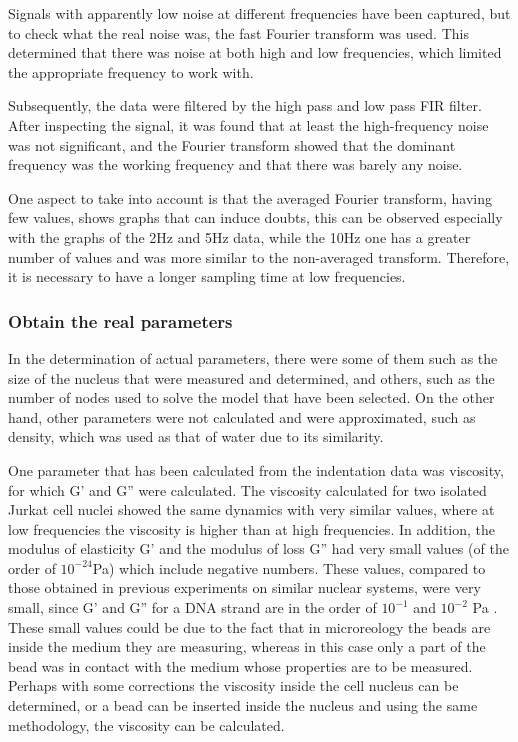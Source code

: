 \documentclass[12pt, a4paper]{article} %
\begin{document}
Signals with apparently low noise at different frequencies have been captured, but to check what the real noise was, the fast Fourier transform was used. This determined that there was noise at both high and low frequencies, which limited the appropriate frequency to work with.

\setlength{\parskip}{4mm}

Subsequently, the data were filtered by the high pass and low pass FIR filter. After inspecting the signal, it was found that at least the high-frequency noise was not significant, and the Fourier transform showed that the dominant frequency was the working frequency and that there was barely any noise.

One aspect to take into account is that the averaged Fourier transform, having few values, shows graphs that can induce doubts, this can be observed especially with the graphs of the 2Hz and 5Hz data, while the 10Hz one has a greater number of values and was more similar to the non-averaged transform. Therefore, it is necessary to have a longer sampling time at low frequencies.

\setlength{\parskip}{0mm}

\subsubsection{Obtain the real parameters}

In the determination of actual parameters, there were some of them such as the size of the nucleus that were measured and determined, and others, such as the number of nodes used to solve the model that have been selected. On the other hand, other parameters were not calculated and were approximated, such as density, which was used as that of water due to its similarity.

\setlength{\parskip}{4mm}

One parameter that has been calculated from the indentation data was viscosity, for which G' and G'' were calculated. The viscosity calculated for two isolated Jurkat cell nuclei showed the same dynamics with very similar values, where at low frequencies the viscosity is higher than at high frequencies. In addition, the modulus of elasticity G' and the modulus of loss G'' had very small values (of the order of $10^{-24}$Pa) which include negative numbers. These values, compared to those obtained in previous experiments on similar nuclear systems, were very small, since G' and G'' for a DNA strand are in the order of $10^{-1}$ and $10^{-2}$ Pa \cite{robertson2018optical}. These small values could be due to the fact that in microreology the beads are inside the medium they are measuring, whereas in this case only a part of the bead was in contact with the medium whose properties are to be measured. Perhaps with some corrections the viscosity inside the cell nucleus can be determined, or a bead can be inserted inside the nucleus and using the same methodology, the viscosity can be calculated.
\end{document}
